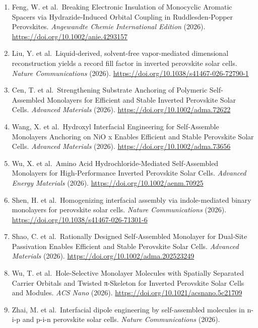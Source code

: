 \documentclass[
  11pt,
]{article}
\begin{document}
\begin{enumerate}
  Heterostructure for 26.49\% Efficient and Stable Inverted Perovskite
  Solar Cells. \emph{Angewandte Chemie International Edition} (2026).
  \url{https://doi.org/10.1002/anie.8890696}
\item
  Feng, W. et al.~Breaking Electronic Insulation of Monocyclic Aromatic
  Spacers via Hydrazide‐Induced Orbital Coupling in Ruddlesden‐Popper
  Perovskites. \emph{Angewandte Chemie International Edition} (2026).
  \url{https://doi.org/10.1002/anie.4293157}
\item
  Liu, Y. et al.~Liquid-derived, solvent-free vapor-mediated dimensional
  reconstruction yields a record fill factor in inverted perovskite
  solar cells. \emph{Nature Communications} (2026).
  \url{https://doi.org/10.1038/s41467-026-72790-1}
\item
  Cen, T. et al.~Strengthening Substrate Anchoring of Polymeric
  Self‐Assembled Monolayers for Efficient and Stable Inverted Perovskite
  Solar Cells. \emph{Advanced Materials} (2026).
  \url{https://doi.org/10.1002/adma.72622}
\item
  Wang, X. et al.~Hydroxyl Interfacial Engineering for Self‐Assemble
  Monolayers Anchoring on NiO x Enables Efficient and Stable Perovskite
  Solar Cells. \emph{Advanced Materials} (2026).
  \url{https://doi.org/10.1002/adma.73656}
\item
  Wu, X. et al.~Amino Acid Hydrochloride‐Mediated Self‐Assembled
  Monolayers for High‐Performance Inverted Perovskite Solar Cells.
  \emph{Advanced Energy Materials} (2026).
  \url{https://doi.org/10.1002/aenm.70925}
\item
  Shen, H. et al.~Homogenizing interfacial assembly via indole-mediated
  binary monolayers for perovskite solar cells. \emph{Nature
  Communications} (2026).
  \url{https://doi.org/10.1038/s41467-026-71301-6}
\item
  Shao, C. et al.~Rationally Designed Self‐Assembled Monolayer for
  Dual‐Site Passivation Enables Efficient and Stable Perovskite Solar
  Cells. \emph{Advanced Materials} (2026).
  \url{https://doi.org/10.1002/adma.202523249}
\item
  Wu, T. et al.~Hole-Selective Monolayer Molecules with Spatially
  Separated Carrier Orbitals and Twisted π-Skeleton for Inverted
  Perovskite Solar Cells and Modules. \emph{ACS Nano} (2026).
  \url{https://doi.org/10.1021/acsnano.5c21709}
\item
  Zhai, M. et al.~Interfacial dipole engineering by self-assembled
  molecules in n-i-p and p-i-n perovskite solar cells. \emph{Nature
  Communications} (2026).

\end{enumerate}
\end{document}
